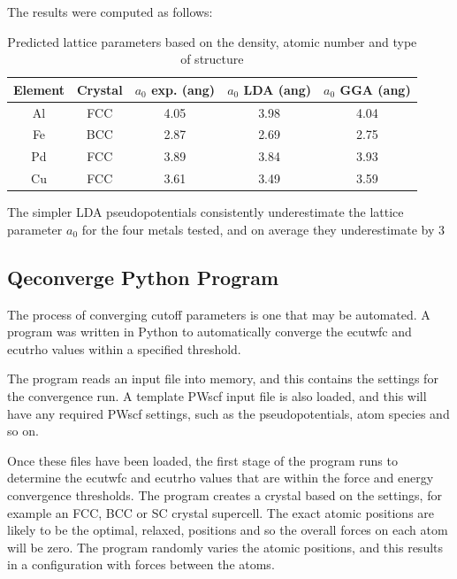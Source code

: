 The results were computed as follows:

\begin{table}[h]
\begin{center}
\begin{tabular}{c c c c c}
\hline
Element & Crystal & $a_0$ exp. (ang) & $a_0$ LDA (ang) & $a_0$ GGA (ang) \\
\hline
Al     & FCC  &  4.05  &  3.98  &  4.04   \\ 
Fe     & BCC  &  2.87  &  2.69  &  2.75   \\ 
Pd     & FCC  &  3.89  &  3.84  &  3.93   \\ 
Cu     & FCC  &  3.61  &  3.49  &  3.59   \\ 
\end{tabular}
\end{center}
\caption{Predicted lattice parameters based on the density, atomic number and type of structure}
\end{table}

The simpler LDA pseudopotentials consistently underestimate the lattice parameter $a_0$ for the four metals tested, and on average they underestimate by 3%



\subsection{Qeconverge Python Program}

The process of converging cutoff parameters is one that may be automated.  A program was written in Python to automatically converge the ecutwfc and ecutrho values within a specified threshold.

The program reads an input file into memory, and this contains the settings for the convergence run.  A template PWscf input file is also loaded, and this will have any required PWscf settings, such as the pseudopotentials, atom species and so on.  

Once these files have been loaded, the first stage of the program runs to determine the ecutwfc and ecutrho values that are within the force and energy convergence thresholds.  The program creates a crystal based on the settings, for example an FCC, BCC or SC crystal supercell.  The exact atomic positions are likely to be the optimal, relaxed, positions and so the overall forces on each atom will be zero.  The program randomly varies the atomic positions, and this results in a configuration with forces between the atoms.

